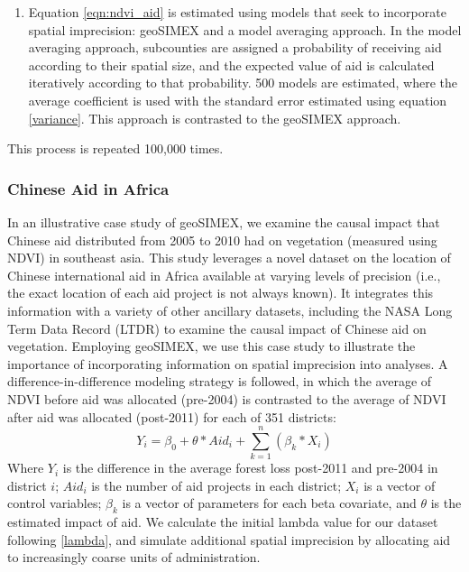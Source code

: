 \begin{enumerate}
\item Equation \ref{eqn:ndvi_aid} is estimated using models that seek to incorporate spatial imprecision: geoSIMEX and a model averaging approach. In the model averaging approach, subcounties are assigned a probability of receiving aid according to their spatial size, and the expected value of aid is calculated iteratively according to that probability.  500 models are estimated, where the average coefficient is used with the standard error estimated using equation \ref{variance}. This approach is contrasted to the geoSIMEX approach.
\end{enumerate}

This process is repeated 100,000 times. 

\subsubsection{Chinese Aid in Africa}
In an illustrative case study of geoSIMEX, we examine the causal impact that Chinese aid distributed from 2005 to 2010 had on vegetation (measured using NDVI) in southeast asia.  
This study leverages a novel dataset on the location of Chinese international aid in Africa available at varying levels of precision (i.e., the exact location of each aid project is not always known).  
It integrates this information with a variety of other ancillary datasets, including the NASA Long Term Data Record (LTDR) to examine the causal impact of Chinese aid on vegetation.  
Employing geoSIMEX, we use this case study to illustrate the importance of incorporating information on spatial imprecision into analyses.
A difference-in-difference modeling strategy is followed, in which the average of NDVI before aid was allocated (pre-2004) is contrasted to the average of NDVI after aid was allocated (post-2011) for each of 351 districts:
\begin{equation}\label{eq:caseStudy}
Y_{i} = \beta_0 + \theta * Aid_{i} + \sum_{k=1}^{n}(\beta_{k} * X_{i})
\end{equation}
Where $Y_{i}$ is the difference in the average forest loss post-2011 and pre-2004 in district $i$; $Aid_{i}$ is the number of aid projects in each district; $X_{i}$ is a vector of control variables; $\beta_{k}$ is a vector of parameters for each beta covariate, and $\theta$ is the estimated impact of aid.
We calculate the initial lambda value for our dataset following \ref{lambda}, and simulate additional spatial imprecision by allocating aid to increasingly coarse units of administration.  
